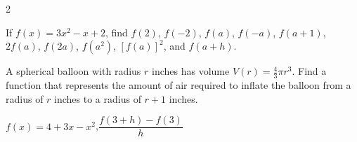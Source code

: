 \documentclass{sebase}
\newenvironment{instructions}{\STARTINSTR}{\ENDINSTR}
\begin{document}
\begin{multicols}{2}
\begin{ExerciseList}
\item[$\hfill $21.] If $f(x)=3x^{2}-x+2$, find $f(2)$, $f(-2)$, $f\left(
a\right) $, $f\left( -a\right) $, $f(a+1)$, $2f(a)$, $f(2a)$, $f(a^{2})$, $%
[f(a)]^{2}$, and $f(a+h)$.

%

%

\item[$\hfill $22.] A spherical balloon with radius $r$ inches has volume 
\newline
$V(r)=\frac{4}{3}\pi r^{3}$. Find a function that represents the amount of
air required to inflate the balloon from a radius of $r$ inches to a radius
of $r+1$ inches.

%
\end{ExerciseList}

\begin{instructions}
\end{instructions}

\begin{ExerciseList}
\item[{$\hfill $\protect\fbox{\hspace{-2pt}23.\hspace{-2pt}}}] $%
f(x)=4+3x-x^{2}$,\qquad $\dfrac{f(3+h)-f(3)}{h}$

%

%


\end{ExerciseList}
\end{multicols}
\end{document}
